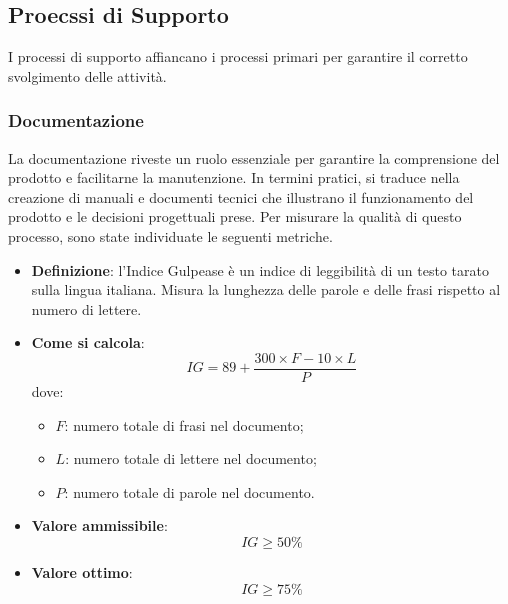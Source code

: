

\subsection{Proecssi di Supporto}
I processi di supporto affiancano i processi primari per garantire il corretto svolgimento delle attività.

\subsubsection{Documentazione}
La documentazione riveste un ruolo essenziale per garantire la comprensione del prodotto e facilitarne la manutenzione.
In termini pratici, si traduce nella creazione di manuali e documenti tecnici che illustrano il funzionamento del prodotto e le decisioni progettuali prese.
Per misurare la qualità di questo processo, sono state individuate le seguenti metriche.

\begin{itemize}
	\item \textbf{Definizione}: l'Indice Gulpease è un indice di leggibilità di un testo tarato sulla lingua italiana. Misura la lunghezza delle parole e delle frasi rispetto al numero di lettere.
	\item \textbf{Come si calcola}: \begin{equation*}IG = 89 + \frac{300 \times F - 10 \times L}{P}\end{equation*} dove:
		\begin{itemize}
			\item $F$: numero totale di frasi nel documento;
			\item $L$: numero totale di lettere nel documento;
			\item $P$: numero totale di parole nel documento.
		\end{itemize}
	\item \textbf{Valore ammissibile}: \begin{equation*}IG \geq 50\%\end{equation*}
	\item \textbf{Valore ottimo}: \begin{equation*}IG \geq 75\%\end{equation*}
\end{itemize}

